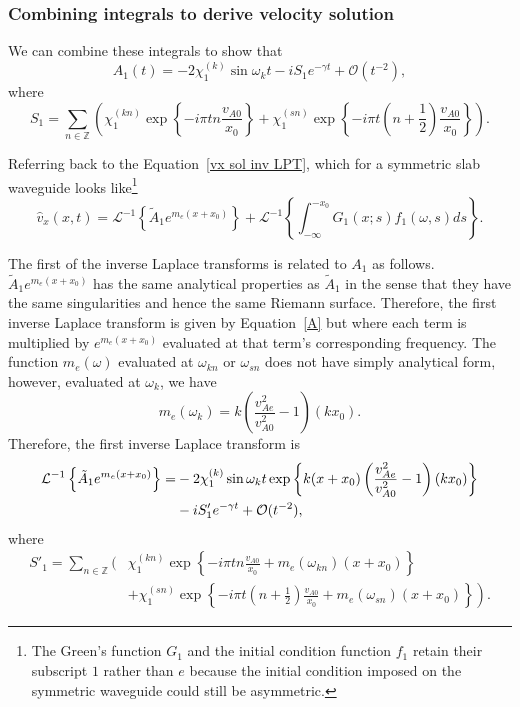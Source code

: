 \subsubsection{Combining integrals to derive velocity solution}
We can combine these integrals to show that
\begin{equation}
A_1(t) = -2\chi_1^{(k)}\sin{\omega_k t} - iS_1 e^{-\gamma t} + \mathcal{O}(t^{-2}),
\label{A}
\end{equation}
where
\begin{equation}
S_1 = \sum_{n \in \mathbb{Z}} \left( \chi_1^{(kn)}\exp\left\{-i\pi t n \frac{v_{A0}}{x_0}\right\} + \chi_1^{(sn)}\exp\left\{-i\pi t \left(n+\frac{1}{2}\right) \frac{v_{A0}}{x_0}\right\} \right).
\end{equation}

Referring back to the Equation~\eqref{vx sol inv LPT}, which for a symmetric slab waveguide looks like\footnote{The Green's function $G_1$ and the initial condition function $f_1$ retain their subscript $1$ rather than $e$ because the initial condition imposed on the symmetric waveguide could still be asymmetric.}
\begin{equation}
\widehat{v}_x(x, t) = \mathcal{L}^{-1} \left\{ \tilde{A}_1 e^{m_e(x + x_0)} \right\} + \mathcal{L}^{-1} \left\{ \int_{-\infty}^{-x_0} G_1(x; s)f_1(\omega, s)ds \right\}.
\label{vx sol inv LPT sym}
\end{equation}

The first of the inverse Laplace transforms is related to $A_1$ as follows. $\tilde{A}_1e^{m_e(x + x_0)}$ has the same analytical properties as $\tilde{A}_1$ in the sense that they have the same singularities and hence the same Riemann surface. Therefore, the first inverse Laplace transform is given by Equation~\eqref{A} but where each term is multiplied by $e^{m_e(x + x_0)}$ evaluated at that term's corresponding frequency. The function $m_e(\omega)$ evaluated at $\omega_{kn}$ or $\omega_{sn}$ does not have simply analytical form, however, evaluated at $\omega_k$, we have
\begin{equation}
m_e(\omega_k) = k\left( \frac{v_{Ae}^2}{v_{A0}^2} - 1 \right) (kx_0).
\end{equation}
Therefore, the first inverse Laplace transform is
\begin{align}
\mathcal{L}^{-1} \left\{ \tilde{A}_1 e^{m_e(x + x_0)} \right\} = &-2\chi_1^{(k)}\sin{\omega_k t}\exp\left\{ k(x + x_0)\left( \frac{v_{Ae}^2}{v_{A0}^2} - 1 \right) (kx_0) \right\} \notag \\
&- iS'_1 e^{-\gamma t} + \mathcal{O}(t^{-2}),
\end{align}
where
\begin{align}
S'_1 = \sum_{n \in \mathbb{Z}} \bigg( & \chi_1^{(kn)}\exp\left\{-i\pi t n \frac{v_{A0}}{x_0} + m_e(\omega_{kn})(x + x_0) \right\} \\
&\left.+ \chi_1^{(sn)}\exp\left\{-i\pi t \left(n+\frac{1}{2}\right) \frac{v_{A0}}{x_0} + m_e(\omega_{sn})(x + x_0)\right\} \right).
\end{align}

